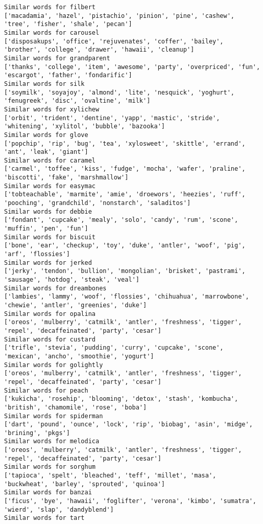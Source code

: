 \documentclass[11pt]{article}
\begin{document}
\begin{Verbatim}[commandchars=\\\{\}]
Similar words for filbert
['macadamia', 'hazel', 'pistachio', 'pinion', 'pine', 'cashew', 'tree', 'fisher', 'shale', 'pecan']
Similar words for carousel
['disposakups', 'office', 'rejuvenates', 'coffer', 'bailey', 'brother', 'college', 'drawer', 'hawaii', 'cleanup']
Similar words for grandparent
['thanks', 'college', 'item', 'awesome', 'party', 'overpriced', 'fun', 'escargot', 'father', 'fondarific']
Similar words for silk
['soymilk', 'soyajoy', 'almond', 'lite', 'nesquick', 'yoghurt', 'fenugreek', 'disc', 'ovaltine', 'milk']
Similar words for xylichew
['orbit', 'trident', 'dentine', 'yapp', 'mastic', 'stride', 'whitening', 'xylitol', 'bubble', 'bazooka']
Similar words for glove
['popchip', 'rip', 'bug', 'tea', 'xylosweet', 'skittle', 'errand', 'ant', 'leak', 'giant']
Similar words for caramel
['carmel', 'toffee', 'kiss', 'fudge', 'mocha', 'wafer', 'praline', 'biscotti', 'fake', 'marshmallow']
Similar words for easymac
['tobteachable', 'marmite', 'amie', 'droewors', 'heezies', 'ruff', 'pooching', 'grandchild', 'nonstarch', 'saladitos']
Similar words for debbie
['fondant', 'cupcake', 'mealy', 'solo', 'candy', 'rum', 'scone', 'muffin', 'pen', 'fun']
Similar words for biscuit
['bone', 'ear', 'checkup', 'toy', 'duke', 'antler', 'woof', 'pig', 'arf', 'flossies']
Similar words for jerked
['jerky', 'tendon', 'bullion', 'mongolian', 'brisket', 'pastrami', 'sausage', 'hotdog', 'steak', 'veal']
Similar words for dreambones
['lambies', 'lammy', 'woof', 'flossies', 'chihuahua', 'marrowbone', 'chewie', 'antler', 'greenies', 'duke']
Similar words for opalina
['oreos', 'mulberry', 'catmilk', 'antler', 'freshness', 'tigger', 'repel', 'decaffeinated', 'party', 'cesar']
Similar words for custard
['trifle', 'stevia', 'pudding', 'curry', 'cupcake', 'scone', 'mexican', 'ancho', 'smoothie', 'yogurt']
Similar words for golightly
['oreos', 'mulberry', 'catmilk', 'antler', 'freshness', 'tigger', 'repel', 'decaffeinated', 'party', 'cesar']
Similar words for peach
['kukicha', 'rosehip', 'blooming', 'detox', 'stash', 'kombucha', 'british', 'chamomile', 'rose', 'boba']
Similar words for spiderman
['dart', 'pound', 'ounce', 'lock', 'rip', 'biobag', 'asin', 'midge', 'brining', 'pkgs']
Similar words for melodica
['oreos', 'mulberry', 'catmilk', 'antler', 'freshness', 'tigger', 'repel', 'decaffeinated', 'party', 'cesar']
Similar words for sorghum
['tapioca', 'spelt', 'bleached', 'teff', 'millet', 'masa', 'buckwheat', 'barley', 'sprouted', 'quinoa']
Similar words for banzai
['ficus', 'bye', 'hawaii', 'foglifter', 'verona', 'kimbo', 'sumatra', 'wierd', 'slap', 'dandyblend']
Similar words for tart

\end{Verbatim}
\end{document}
